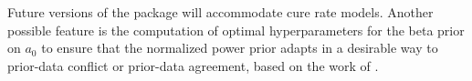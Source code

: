 Future versions of the package will accommodate cure rate models. Another possible feature is the computation of optimal hyperparameters for the beta prior on $a_0$ to ensure that the normalized power prior adapts in a desirable way to prior-data conflict or prior-data agreement, based on the work of \cite{shen_2023}. 



\address{Yueqi Shen\\
  Department of Biostatistics\\
  University of North Carolina at Chapel Hill\\
  Currently affliated with Merck \& Co.\\
  United States\\
  }

\address{Matthew A. Psioda\\
  GSK\\
  United States\\
  }

\address{Joseph G. Ibrahim\\
  Department of Biostatistics\\
  University of North Carolina at Chapel Hill\\
  United States\\
  }
